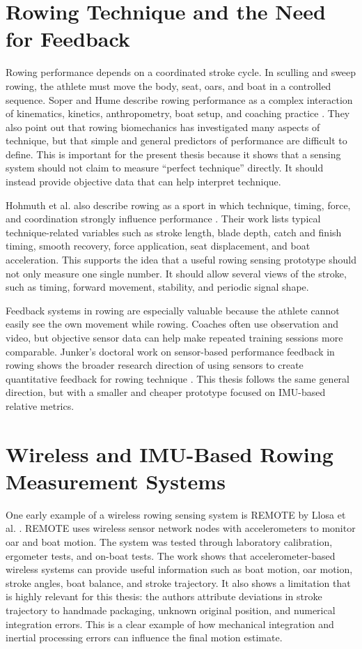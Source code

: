 \section{Rowing Technique and the Need for Feedback}

Rowing performance depends on a coordinated stroke cycle. In sculling and sweep rowing, the athlete must move the body, seat, oars, and boat in a controlled sequence. Soper and Hume describe rowing performance as a complex interaction of kinematics, kinetics, anthropometry, boat setup, and coaching practice \cite{soper_towards_2004}. They also point out that rowing biomechanics has investigated many aspects of technique, but that simple and general predictors of performance are difficult to define. This is important for the present thesis because it shows that a sensing system should not claim to measure ``perfect technique'' directly. It should instead provide objective data that can help interpret technique.

Hohmuth et al. also describe rowing as a sport in which technique, timing, force, and coordination strongly influence performance \cite{hohmuth_wireless_2023}. Their work lists typical technique-related variables such as stroke length, blade depth, catch and finish timing, smooth recovery, force application, seat displacement, and boat acceleration. This supports the idea that a useful rowing sensing prototype should not only measure one single number. It should allow several views of the stroke, such as timing, forward movement, stability, and periodic signal shape.

Feedback systems in rowing are especially valuable because the athlete cannot easily see the own movement while rowing. Coaches often use observation and video, but objective sensor data can help make repeated training sessions more comparable. Junker's doctoral work on sensor-based performance feedback in rowing shows the broader research direction of using sensors to create quantitative feedback for rowing technique \cite{junker_sensor-based_2015}. This thesis follows the same general direction, but with a smaller and cheaper prototype focused on IMU-based relative metrics.

\section{Wireless and IMU-Based Rowing Measurement Systems}

One early example of a wireless rowing sensing system is REMOTE by Llosa et al. \cite{llosa_remote_2009}. REMOTE uses wireless sensor network nodes with accelerometers to monitor oar and boat motion. The system was tested through laboratory calibration, ergometer tests, and on-boat tests. The work shows that accelerometer-based wireless systems can provide useful information such as boat motion, oar motion, stroke angles, boat balance, and stroke trajectory. It also shows a limitation that is highly relevant for this thesis: the authors attribute deviations in stroke trajectory to handmade packaging, unknown original position, and numerical integration errors. This is a clear example of how mechanical integration and inertial processing errors can influence the final motion estimate.

